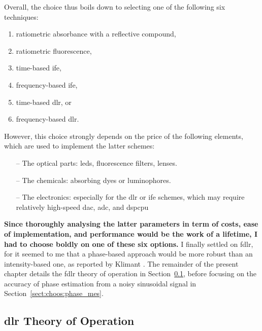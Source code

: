 Overall, the choice thus boils down to selecting one of the following six techniques:
\begin{multicols}{2}
\begin{enumerate}
	\item ratiometric absorbance with a reflective compound,
	\item ratiometric fluorescence,
	\item time-based \gls{ife},
	\item frequency-based \gls{ife},
	\item time-based \gls{dlr}, or
	\item frequency-based \gls{dlr}.
\end{enumerate}
\end{multicols}
However, this choice strongly depends on the price of the following elements, which are used to implement the latter schemes:
\begin{itemize}
	\item[--] The optical parts: \glspl{led}, fluorescence filters, lenses.
	\item[--] The chemicals: absorbing dyes or luminophores.
	\item[--] The electronics: especially for the \gls{dlr} or \gls{ife} schemes, which may require relatively high-speed \gls{dac}, \gls{adc}, and \gls{dspcpu}
\end{itemize}

\textbf{Since thoroughly analysing the latter parameters in term of costs, ease of implementation, and performance would be the work of a lifetime, I had to choose boldly on one of these six options.} I finally settled on \gls{fdlr}, for it seemed to me that a phase-based approach would be more robust than an intensity-based one, as reported by Klimant \etal{}\cite{klimant2001_pap}. The remainder of the present chapter details the \gls{fdlr} theory of operation in Section~\ref{sect:choos:dye_based:dlr_theory}, before focusing on the accuracy of phase estimation from a noisy sinusoidal signal in Section~\ref{sect:choos:phase_mes}.

\subsection{\texorpdfstring{\gls{dlr}}{DLR} Theory of Operation}\label{sect:choos:dye_based:dlr_theory}


